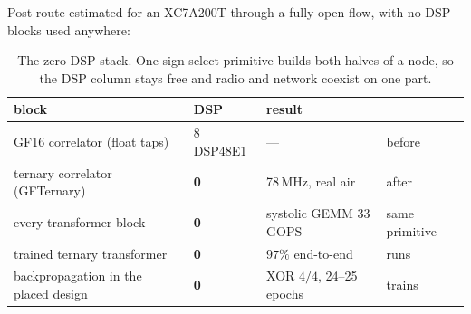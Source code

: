 

Post-route estimated for an XC7A200T through a fully open flow, with no DSP blocks used
anywhere:

\begin{table}[t]\centering
\caption{The zero-DSP stack. One sign-select primitive builds both halves of a
node, so the DSP column stays free and radio and network coexist on one part.}
\label{tab:zerodsp}
\small
\begin{tabular}{llll}
\toprule
block & DSP & result & \\
\midrule
GF16 correlator (float taps) & 8 DSP48E1 & --- & before \\
ternary correlator (GFTernary) & \textbf{0} & 78\,MHz, real air & after \\
every transformer block & \textbf{0} & systolic GEMM 33\,GOPS & same primitive \\
trained ternary transformer & \textbf{0} & $97\%$ end-to-end & runs \\
backpropagation in the placed design & \textbf{0} & XOR $4/4$, 24--25 epochs & trains \\
\bottomrule
\end{tabular}
\end{table}

